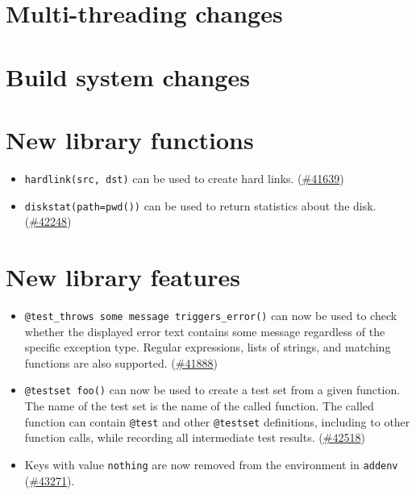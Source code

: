 \hypertarget{14570500277119829183}{}


\chapter{Multi-threading changes}



\hypertarget{2615165321246055486}{}


\chapter{Build system changes}



\hypertarget{11814740728129372900}{}


\chapter{New library functions}



\begin{itemize}
\item \texttt{hardlink(src, dst)} can be used to create hard links. (\href{https://github.com/JuliaLang/julia/issues/41639}{\#41639})


\item \texttt{diskstat(path=pwd())} can be used to return statistics about the disk. (\href{https://github.com/JuliaLang/julia/issues/42248}{\#42248})

\end{itemize}


\hypertarget{7948362685613917540}{}


\chapter{New library features}



\begin{itemize}
\item \texttt{@test\_throws {\textquotedbl}some message{\textquotedbl} triggers\_error()} can now be used to check whether the displayed error text contains {\textquotedbl}some message{\textquotedbl} regardless of the specific exception type. Regular expressions, lists of strings, and matching functions are also supported. (\href{https://github.com/JuliaLang/julia/issues/41888}{\#41888})


\item \texttt{@testset foo()} can now be used to create a test set from a given function. The name of the test set is the name of the called function. The called function can contain \texttt{@test} and other \texttt{@testset} definitions, including to other function calls, while recording all intermediate test results. (\href{https://github.com/JuliaLang/julia/issues/42518}{\#42518})


\item Keys with value \texttt{nothing} are now removed from the environment in \texttt{addenv} (\href{https://github.com/JuliaLang/julia/issues/43271}{\#43271}).

\end{itemize}


